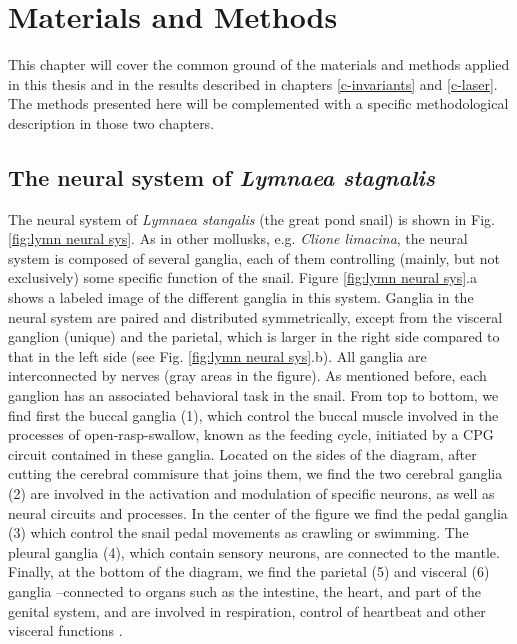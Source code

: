 \chapter{Materials and Methods}
This chapter will cover the common ground of the materials and methods applied in this thesis and in the results described in chapters \ref{c-invariants} and \ref{c-laser}. The methods presented here will be complemented with a specific methodological description in those two chapters.

\section{The neural system of \textit{Lymnaea stagnalis}}
\label{sec:lymnaea morphology}
The neural system of \textit{Lymnaea stangalis} (the great pond snail) is shown in Fig. \ref{fig:lymn neural sys}. As in other mollusks, e.g. {\sl Clione limacina}, the neural system is composed of several ganglia, each of them controlling (mainly, but not exclusively) some specific function of the snail. Figure \ref{fig:lymn neural sys}.a shows a labeled image of the different ganglia in this system. Ganglia in the neural system are paired and distributed symmetrically, except from the visceral ganglion (unique) and the parietal, which is larger in the right side compared to that in the left side (see Fig. \ref{fig:lymn neural sys}.b). All ganglia are interconnected by nerves (gray areas in the figure). As mentioned before, each ganglion has an associated behavioral task in the snail. From top to bottom, we find first the buccal ganglia (1), which control the buccal muscle involved in the processes of open-rasp-swallow, known as the feeding cycle, initiated by a CPG circuit contained in these ganglia. Located on the sides of the diagram, after cutting the cerebral commisure that joins them, we find the two cerebral ganglia (2) are involved in the activation and modulation of specific neurons, as well as neural circuits and processes. In the center of the figure we find the pedal ganglia (3) which control the snail pedal movements as crawling or swimming.  The pleural ganglia (4), which contain sensory neurons, are connected to the mantle. Finally, at the bottom of the diagram, we find the parietal (5) and visceral (6) ganglia --connected to organs such as the intestine, the heart, and part of the genital system, and are involved in respiration, control of heartbeat and other visceral functions \parencite{benjamin_lymnaea_2008}.



